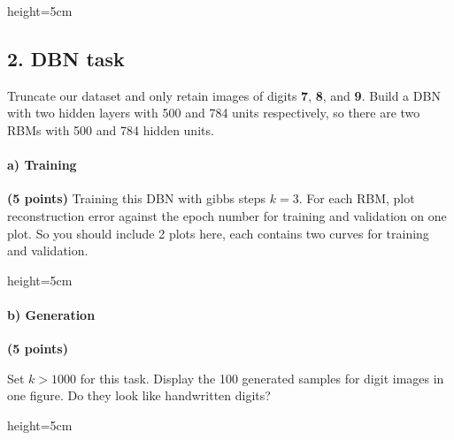 \begin{soln}{height=5cm}
\end{soln}


\subsection*{2. DBN task}
Truncate our dataset and only retain images of digits \textbf{7}, \textbf{8}, and \textbf{9}.
Build a DBN with two hidden layers with 500 and 784 units respectively, so there are two RBMs with 500 and 784 hidden units. 

\paragraph{a) Training} \textbf{(5 points)}
Training this DBN with gibbs steps $k=3$. For each RBM, plot reconstruction error against the epoch number for training and validation on one plot. So you should include 2 plots here, each contains two curves for training and validation.

\begin{soln}{height=5cm}
\end{soln}

\paragraph{b) Generation} \textbf{(5 points)}

Set $k>1000$ for this task. Display the 100 generated samples for digit images in one figure. Do they look like handwritten digits? 

\begin{soln}{height=5cm}
\end{soln}